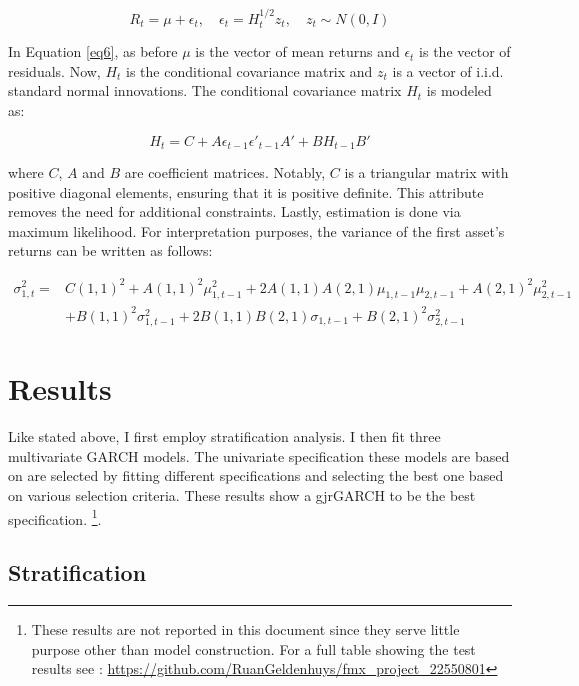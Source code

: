 \documentclass[11pt,preprint, authoryear]{elsarticle}
\numberwithin{equation}{section}
\numberwithin{figure}{section}
\numberwithin{table}{section}
\let\rmarkdownfootnote\footnote%
\def\footnote{\protect\rmarkdownfootnote}
\begin{document}
\begin{equation}
R_t = \mu + \epsilon_t, \quad \epsilon_t = H_t^{1/2} z_t, \quad z_t \sim N(0, I) \label{eq6}
\end{equation}

In Equation \ref{eq6}, as before \(\mu\) is the vector of mean returns
and \(\epsilon_t\) is the vector of residuals. Now, \(H_t\) is the
conditional covariance matrix and \(z_t\) is a vector of i.i.d. standard
normal innovations. The conditional covariance matrix \(H_t\) is modeled
as:

\begin{equation}
H_t = C + A \epsilon_{t-1} \epsilon'_{t-1} A' + B H_{t-1} B' \label{eq7}
\end{equation}

where \(C\), \(A\) and \(B\) are coefficient matrices. Notably, \(C\) is
a triangular matrix with positive diagonal elements, ensuring that it is
positive definite. This attribute removes the need for additional
constraints. Lastly, estimation is done via maximum likelihood. For
interpretation purposes, the variance of the first asset's returns can
be written as follows:

\begin{align}
\sigma^2_{1,t} = & C(1,1)^2 + A(1,1)^2\mu^2_{1,t-1} + 2A(1,1)A(2,1)\mu_{1,t-1}\mu_{2,t-1} + A(2,1)^2\mu^2_{2,t-1} \label{eq8}\\
& + B(1,1)^2\sigma^2_{1,t-1} + 2B(1,1)B(2,1)\sigma_{1,t-1} + B(2,1)^2\sigma^2_{2,t-1} 
\end{align}

\hypertarget{results}{%
\section{Results}\label{results}}

Like stated above, I first employ stratification analysis. I then fit
three multivariate GARCH models. The univariate specification these
models are based on are selected by fitting different specifications and
selecting the best one based on various selection criteria. These
results show a gjrGARCH to be the best specification.
\footnote{These results are not reported in this document since they serve little purpose other than model construction. For a full table showing the test results see : \url{https://github.com/RuanGeldenhuys/fmx_project_22550801}}.

\hypertarget{stratification}{%
\subsection{Stratification}\label{stratification}}
\end{document}
